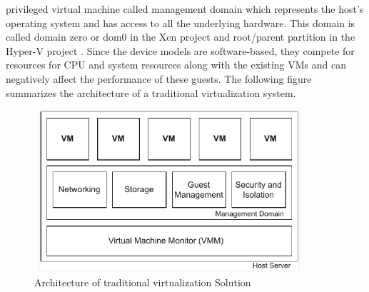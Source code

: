 privileged virtual machine called management domain which represents the host's operating system and 
has access to all the underlying hardware. This domain is called domain zero or dom0 in the Xen project 
and root/parent partition in the Hyper-V project \cite{nitro_whitepaper}. Since the device models are 
software-based, they compete for resources for CPU and system resources along with the existing VMs and 
can negatively affect the performance of these guests. 
The following figure summarizes the architecture of a traditional virtualization system. 
\begin{figure}[H]
  \centering
  \includegraphics[width=10cm, height=6cm]{figures/traditional_hypervisor.pdf}
  \caption{Architecture of traditional virtualization Solution}
  \label{fig:hyper}
\end{figure}

